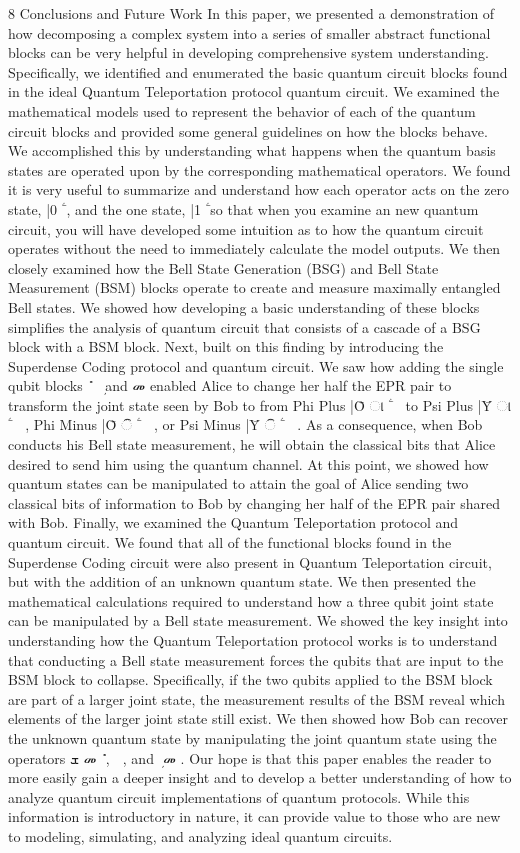 8 Conclusions and Future Work In this paper, we presented a demonstration of how decomposing a complex system into a series of smaller abstract functional blocks can be very helpful in developing comprehensive system understanding. Specifically, we identified and enumerated the basic quantum circuit blocks found in the ideal Quantum Teleportation protocol quantum circuit. We examined the mathematical models used to represent the behavior of each of the quantum circuit blocks and provided some general guidelines on how the blocks behave. We accomplished this by understanding what happens when the quantum basis states are operated upon by the corresponding mathematical operators. We found it is very useful to summarize and understand how each operator acts on the zero state, |0 ۧ , and the one state, |1 ۧ so that when you examine an new quantum circuit, you will have developed some intuition as to how the quantum circuit operates without the need to immediately calculate the model outputs. We then closely examined how the Bell State Generation (BSG) and Bell State Measurement (BSM) blocks operate to create and measure maximally entangled Bell states. We showed how developing a basic understanding of these blocks simplifies the analysis of quantum circuit that consists of a cascade of a BSG block with a BSM block. Next, built on this finding by introducing the Superdense Coding protocol and quantum circuit. We saw how adding the single qubit blocks ܺ ෠ ܼ and መ enabled Alice to change her half the EPR pair to transform the joint state seen by Bob to from Phi Plus |Ȱ ା ۧ ஺஻ to Psi Plus |Ȳ ା ۧ ஺஻ , Phi Minus |Ȱ ି ۧ ஺஻ , or Psi Minus |Ȳ ି ۧ ஺஻ . As a consequence, when Bob conducts his Bell state measurement, he will obtain the classical bits that Alice desired to send him using the quantum channel. At this point, we showed how quantum states can be manipulated to attain the goal of Alice sending two classical bits of information to Bob by changing her half of the EPR pair shared with Bob. Finally, we examined the Quantum Teleportation protocol and quantum circuit. We found that all of the functional blocks found in the Superdense Coding circuit were also present in Quantum Teleportation circuit, but with the addition of an unknown quantum state. We then presented the mathematical calculations required to understand how a three qubit joint state can be manipulated by a Bell state measurement. We showed the key insight into understanding how the Quantum Teleportation protocol works is to understand that conducting a Bell state measurement forces the qubits that are input to the BSM block to collapse. Specifically, if the two qubits applied to the BSM block are part of a larger joint state, the measurement results of the BSM reveal which elements of the larger joint state still exist. We then showed how Bob can recover the unknown quantum state by manipulating the joint quantum state using the operators ܫ መ ܺ , ෠ , and ܼ መ . Our hope is that this paper enables the reader to more easily gain a deeper insight and to develop a better understanding of how to analyze quantum circuit implementations of quantum protocols. While this information is introductory in nature, it can provide value to those who are new to modeling, simulating, and analyzing ideal quantum circuits.

